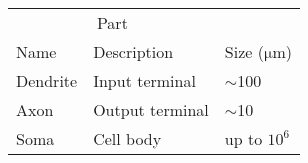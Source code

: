   \begin{tabular}{lll}
    \toprule
    \multicolumn{2}{c}{Part}   &               \\
    \cmidrule(r){1-2}
    Name     & Description     & Size ($\mathrm{\mu m}$) \\
    \midrule
    Dendrite & Input terminal  & $\sim$100     \\
    Axon     & Output terminal & $\sim$10      \\
    Soma     & Cell body       & up to $10^6$  \\
    \bottomrule
  \end{tabular}
